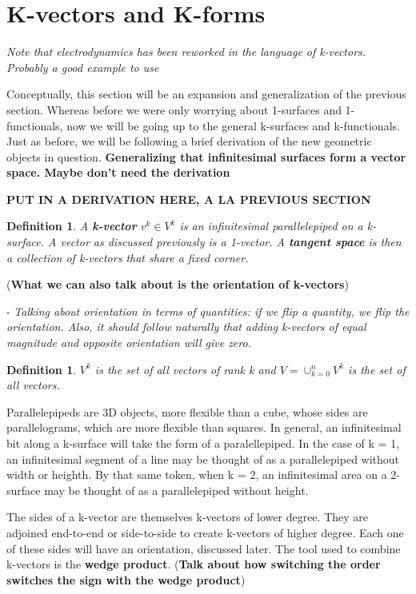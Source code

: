 \documentclass{book}
\newtheorem{defn}[equation]{Definition}
\begin{document}
\section{K-vectors and K-forms}

\emph{Note that electrodynamics has been reworked in the language of k-vectors. Probably a good example to use}

Conceptually, this section will be an expansion and generalization of the previous section. Whereas before we were only worrying about 1-surfaces and 1-functionals, now we will be going up to the general k-surfaces and k-functionals. Just as before, we will be following a brief derivation of the new geometric objects in question. 
\textbf{Generalizing that infinitesimal surfaces form a vector space. Maybe don't need the derivation}

\textbf{PUT IN A DERIVATION HERE, A LA PREVIOUS SECTION}


\begin{defn}
	A \textbf{k-vector} $v^k \in V^k$ is an infinitesimal parallelepiped on a k-surface. A vector as discussed previously is a 1-vector. A \textbf{tangent space} is then a collection of k-vectors that share a fixed corner. 
\end{defn}

(\textbf{What we can also talk about is the orientation of k-vectors})


- \emph{Talking about orientation in terms of quantities: if we flip a quantity, we flip the orientation. Also, it should follow naturally that adding k-vectors of equal magnitude and opposite orientation will give zero.}



\begin{defn}
	$V^k$ is the set of all vectors of rank k and $V = \cup_{k=0}^n V^k$ is the set of all vectors. 
	\end{defn}

Parallelepipeds are 3D objects, more flexible than a cube, whose sides are parallelograms, which are more flexible than squares. In general, an infinitesimal bit along a k-surface will take the form of a paralellepiped. In the case of k = 1, an infinitesimal segment of a line may be thought of as a parallelepiped without width or heighth. By that same token, when k = 2, an infinitesimal area on a 2-surface may be thought of as a parallelepiped without height. 

The sides of a k-vector are themselves k-vectors of lower degree. They are adjoined end-to-end or side-to-side to create k-vectors of higher degree. Each one of these sides will have an orientation, discussed later. The tool used to combine k-vectors is the \textbf{wedge product}. (\textbf{Talk about how switching the order switches the sign with the wedge product}) 
\end{document}
